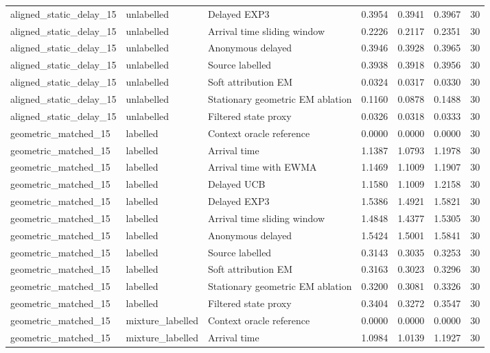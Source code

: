 \begin{tabular}{llllllr}
aligned\_static\_delay\_15 & unlabelled & Delayed EXP3 & 0.3954 & 0.3941 & 0.3967 & 30 \\
aligned\_static\_delay\_15 & unlabelled & Arrival time sliding window & 0.2226 & 0.2117 & 0.2351 & 30 \\
aligned\_static\_delay\_15 & unlabelled & Anonymous delayed & 0.3946 & 0.3928 & 0.3965 & 30 \\
aligned\_static\_delay\_15 & unlabelled & Source labelled & 0.3938 & 0.3918 & 0.3956 & 30 \\
aligned\_static\_delay\_15 & unlabelled & Soft attribution EM & 0.0324 & 0.0317 & 0.0330 & 30 \\
aligned\_static\_delay\_15 & unlabelled & Stationary geometric EM ablation & 0.1160 & 0.0878 & 0.1488 & 30 \\
aligned\_static\_delay\_15 & unlabelled & Filtered state proxy & 0.0326 & 0.0318 & 0.0333 & 30 \\
geometric\_matched\_15 & labelled & Context oracle reference & 0.0000 & 0.0000 & 0.0000 & 30 \\
geometric\_matched\_15 & labelled & Arrival time & 1.1387 & 1.0793 & 1.1978 & 30 \\
geometric\_matched\_15 & labelled & Arrival time with EWMA & 1.1469 & 1.1009 & 1.1907 & 30 \\
geometric\_matched\_15 & labelled & Delayed UCB & 1.1580 & 1.1009 & 1.2158 & 30 \\
geometric\_matched\_15 & labelled & Delayed EXP3 & 1.5386 & 1.4921 & 1.5821 & 30 \\
geometric\_matched\_15 & labelled & Arrival time sliding window & 1.4848 & 1.4377 & 1.5305 & 30 \\
geometric\_matched\_15 & labelled & Anonymous delayed & 1.5424 & 1.5001 & 1.5841 & 30 \\
geometric\_matched\_15 & labelled & Source labelled & 0.3143 & 0.3035 & 0.3253 & 30 \\
geometric\_matched\_15 & labelled & Soft attribution EM & 0.3163 & 0.3023 & 0.3296 & 30 \\
geometric\_matched\_15 & labelled & Stationary geometric EM ablation & 0.3200 & 0.3081 & 0.3326 & 30 \\
geometric\_matched\_15 & labelled & Filtered state proxy & 0.3404 & 0.3272 & 0.3547 & 30 \\
geometric\_matched\_15 & mixture\_labelled & Context oracle reference & 0.0000 & 0.0000 & 0.0000 & 30 \\
geometric\_matched\_15 & mixture\_labelled & Arrival time & 1.0984 & 1.0139 & 1.1927 & 30 \\

\end{tabular}
